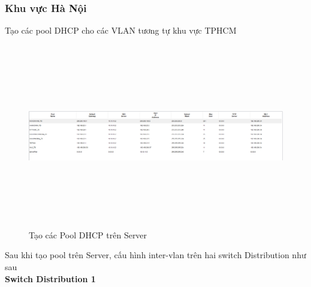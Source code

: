 \documentclass[12pt,a4paper]{report}
\begin{document}
\subsubsection{Khu vực Hà Nội}
\hspace*{0.25cm}Tạo các pool DHCP cho các VLAN tương tự khu vực TPHCM\\
\begin{figure}[H]
    \centering
    \includegraphics[width=16cm, height=8cm]{img/472.png}
    \caption{Tạo các Pool DHCP trên Server}
    \label{hinh472}
\end{figure}
\hspace*{0.25cm}Sau khi tạo pool trên Server, cấu hình inter-vlan trên hai switch Distribution như sau\\
\hspace*{1cm}\textbf{Switch Distribution 1}\\
\end{document}
